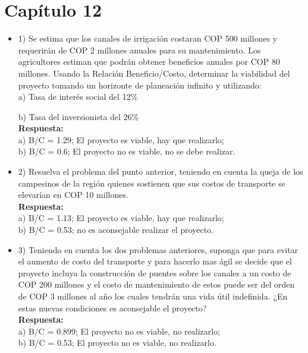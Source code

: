 \chapter*{Capítulo 12}

\begin{itemize}
 \item 1)	 Se estima que los canales de irrigación costaran COP 500 millones y requerirán de COP 2 millones anuales para su mantenimiento. Los agricultores estiman que podrán obtener beneficios anuales por COP 80 millones. Usando la Relación Beneficio/Costo, determinar la viabilidad del proyecto tomando un horizonte de planeación infinito y utilizando:\\

       a) Tasa de interés social del 12\%

       b) Tasa del inversionista del 26\%\\

       \textbf{Respuesta:} \\a)  B/C = 1.29;  El proyecto es viable, hay que realizarlo;\\ b)  B/C = 0.6;  El proyecto no es viable, no se debe realizar.
       \medskip

 \item 2)	Resuelva el problema del punto anterior, teniendo en cuenta la queja de los campesinos de la región quienes sostienen que sus costos de transporte se elevarían en COP 10 millones.\\

       \textbf{Respuesta:} \\a) B/C = 1.13; El proyecto es viable, hay que realizarlo;\\ b) B/C = 0.53; no es aconsejable realizar el proyecto.
       \medskip

 \item 3)	Teniendo en cuenta los dos problemas anteriores, suponga que para evitar el aumento de costo del transporte y para hacerlo mas ágil se decide que el proyecto incluya la construcción de puentes sobre los canales a un costo de COP 200 millones y el costo de mantenimiento de estos puede ser del orden de COP 3 millones al año los cuales tendrán una vida útil indefinida. ¿En estas nuevas condiciones es aconsejable el proyecto?\\

       \textbf{Respuesta:} \\a) B/C = 0.899; El proyecto no es viable, no realizarlo;\\ b) B/C = 0.53; El proyecto no es viable, no realizarlo.
       \medskip


\end{itemize}
